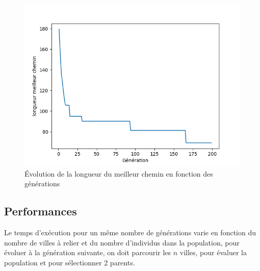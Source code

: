 \documentclass[12pt]{article}
\begin{document}
\begin{figure}[H]
\centering
\includegraphics[width=.9\linewidth]{./evol.png}
\caption{Évolution de la longueur du meilleur chemin en fonction des générations}
\end{figure}

\subsection{Performances}

Le temps d'exécution pour un même nombre de générations varie en fonction du nombre de villes à relier et du nombre
d'individus dans la population, pour évoluer à la génération suivante, on doit parcourir les $n$ villes, pour évaluer
la population et pour sélectionner 2 parents. 
\end{document}
